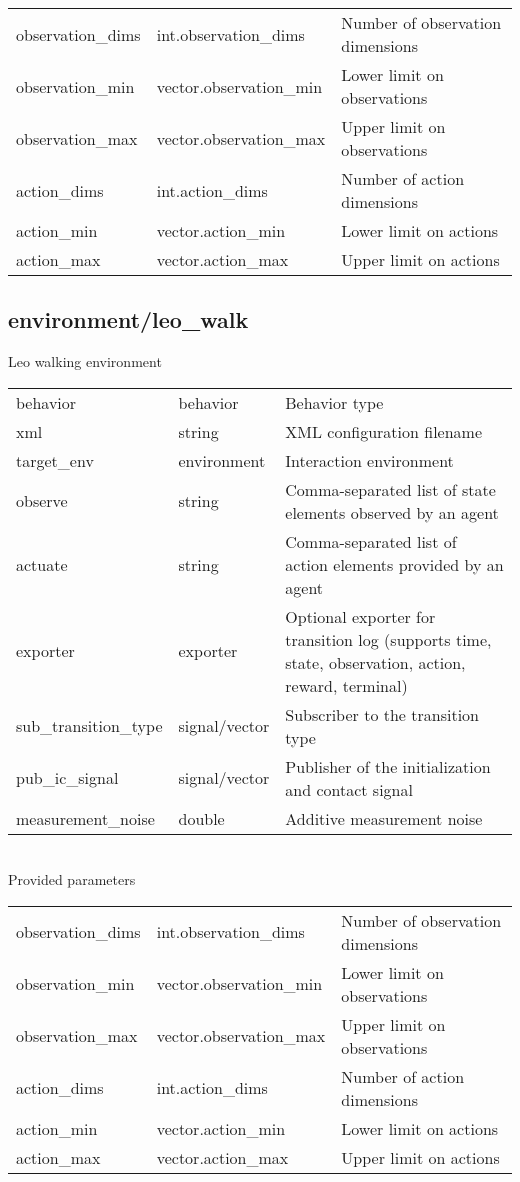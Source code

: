 \noindent\begin{tabular}{@{}lll@{}}
observation\_dims&int.observation\_dims&Number of observation dimensions\\
observation\_min&vector.observation\_min&Lower limit on observations\\
observation\_max&vector.observation\_max&Upper limit on observations\\
action\_dims&int.action\_dims&Number of action dimensions\\
action\_min&vector.action\_min&Lower limit on actions\\
action\_max&vector.action\_max&Upper limit on actions\\
\end{tabular}
\subsection{environment/leo\_walk}
\noindent Leo walking environment\\

\noindent\begin{tabular}{@{}lll@{}}
behavior&behavior&Behavior type\\
xml&string&XML configuration filename\\
target\_env&environment&Interaction environment\\
observe&string&Comma-separated list of state elements observed by an agent\\
actuate&string&Comma-separated list of action elements provided by an agent\\
exporter&exporter&Optional exporter for transition log (supports time, state, observation, action, reward, terminal)\\
sub\_transition\_type&signal/vector&Subscriber to the transition type\\
pub\_ic\_signal&signal/vector&Publisher of the initialization and contact signal\\
measurement\_noise&double&Additive measurement noise\\
\end{tabular}
\\

\noindent Provided parameters\\

\noindent\begin{tabular}{@{}lll@{}}
observation\_dims&int.observation\_dims&Number of observation dimensions\\
observation\_min&vector.observation\_min&Lower limit on observations\\
observation\_max&vector.observation\_max&Upper limit on observations\\
action\_dims&int.action\_dims&Number of action dimensions\\
action\_min&vector.action\_min&Lower limit on actions\\
action\_max&vector.action\_max&Upper limit on actions\\
\end{tabular}
